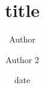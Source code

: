\documentclass{amsart}
\title{title}
\author{Author}
\author{Author 2}
\date{date}
\begin{document}
\begin{abstract}
\blindtext
\end{abstract}

\maketitle

\Blinddocument
\end{document}
